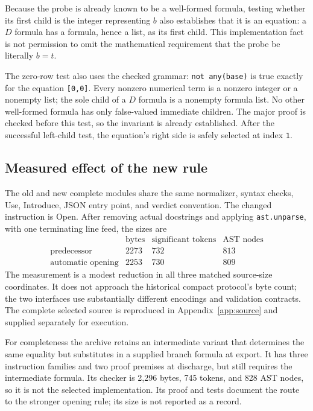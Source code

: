 \documentclass[11pt,letterpaper]{article}
\theoremstyle{definition}
\begin{document}
Because the probe is already known to be a well-formed formula, testing
whether its first child is the integer representing $b$ also establishes
that it is an equation: a $D$ formula has a formula, hence a list, as its
first child.  This implementation fact is not permission to omit the
mathematical requirement that the probe be literally $b=t$.

The zero-row test also uses the checked grammar: \texttt{not any(base)}
is true exactly for the equation \texttt{[0,0]}.  Every nonzero numerical
term is a nonzero integer or a nonempty list; the sole child of a $D$
formula is a nonempty formula list.  No other well-formed formula has
only false-valued immediate children.  The major proof is checked before
this test, so the invariant is already established.  After the successful
left-child test, the equation's right side is safely selected at index
\texttt{1}.

\subsection{Measured effect of the new rule}

The old and new complete modules share the same normalizer, syntax checks,
Use, Introduce, JSON entry point, and verdict convention.  The changed
instruction is Open.  After removing actual docstrings and applying
\texttt{ast.unparse}, with one terminating line feed, the sizes are
\[
\begin{array}{c|rrr}
 &\text{bytes}&\text{significant tokens}&\text{AST nodes}\\\hline
 \text{predecessor}&2273&732&813\\
 \text{automatic opening}&2253&730&809
\end{array}
\]
The measurement is a modest reduction in all three matched source-size
coordinates.  It does not approach the historical compact protocol's byte
count; the two interfaces use substantially different encodings and
validation contracts.  The complete selected source is reproduced in
Appendix~\ref{app:source} and supplied separately for execution.

For completeness the archive retains an intermediate variant that
determines the same equality but substitutes in a supplied branch formula
at export.  It has three instruction families and two proof premises at
discharge, but still requires the intermediate formula.  Its checker is
2,296 bytes, 745 tokens, and 828 AST nodes, so it is not the selected
implementation.  Its proof and tests document the route to the stronger
opening rule; its size is not reported as a record.
\end{document}
